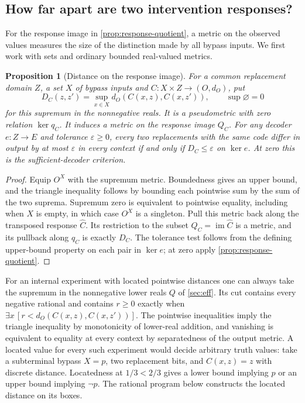 \documentclass[11pt,a4paper]{article}
\newtheorem{proposition}[proposition]{Proposition}
\theoremstyle{definition}
\theoremstyle{remark}\newaliascnt{remark}{theorem}
\numberwithin{equation}{section}
\begin{document}
\subsection{How far apart are two intervention responses?}\label{sec:response-distance}
For the response image in \cref{prop:response-quotient}, a metric on the observed values measures the size of the distinction made by all bypass inputs. We first work with sets and ordinary bounded real-valued metrics.

\begin{proposition}[Distance on the response image]\label{prop:response-distance}
For a common replacement domain \(Z\), a set \(X\) of bypass inputs and \(C:X\times Z\to(O,d_O)\), put
\[
 D_C(z,z')=\sup_{x\in X}d_O(C(x,z),C(x,z')),\qquad \sup\varnothing=0
\]
for this supremum in the nonnegative reals. It is a pseudometric with zero relation \(\ker q_C\). It induces a metric on the response image \(Q_C\). For any decoder \(e:Z\to E\) and tolerance \(\varepsilon\ge0\), every two replacements with the same code differ in output by at most \(\varepsilon\) in every context if and only if \(D_C\le\varepsilon\) on \(\ker e\). At zero this is the sufficient-decoder criterion.
\end{proposition}
\begin{proof}
Equip \(O^X\) with the supremum metric. Boundedness gives an upper bound, and the triangle inequality follows by bounding each pointwise sum by the sum of the two suprema. Supremum zero is equivalent to pointwise equality, including when \(X\) is empty, in which case \(O^X\) is a singleton. Pull this metric back along the transposed response \(\widehat C\). Its restriction to the subset \(Q_C=\operatorname{im}\widehat C\) is a metric, and its pullback along \(q_C\) is exactly \(D_C\). The tolerance test follows from the defining upper-bound property on each pair in \(\ker e\); at zero apply \cref{prop:response-quotient}.
\end{proof}
For an internal experiment with located pointwise distances one can always take the supremum in the nonnegative lower reals $Q$ of \cref{sec:eff}. Its cut contains every negative rational and contains $r\ge0$ exactly when $\exists x\, [r<d_O(C(x,z),C(x,z'))]$. The pointwise inequalities imply the triangle inequality by monotonicity of lower-real addition, and vanishing is equivalent to equality at every context by separatedness of the output metric. A located value for every such experiment would decide arbitrary truth values: take a subterminal bypass $X=p$, two replacement bits, and $C(x,z)=z$ with discrete distance. Locatedness at $1/3<2/3$ gives a lower bound implying $p$ or an upper bound implying $\neg p$. The rational program below constructs the located distance on its boxes.
\end{document}
